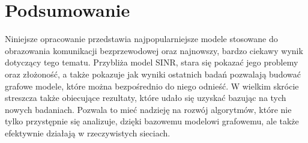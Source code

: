 \documentclass[11pt,a4paper,onecolumn,twoside]{mwart}
\begin{document}
\section{Podsumowanie}
Niniejsze opracowanie przedstawia najpopularniejsze modele stosowane do
obrazowania komunikacji bezprzewodowej oraz najnowszy, bardzo ciekawy wynik
dotyczący tego tematu. Przybliża model SINR, stara się pokazać jego problemy
oraz złożoność, a także pokazuje jak wyniki ostatnich badań pozwalają budować
grafowe modele, które można bezpośrednio do niego odnieść. W wielkim skrócie
streszcza także obiecujące rezultaty, które udało się uzyskać bazując na tych
nowych badaniach. Pozwala to mieć nadzieję na rozwój algorytmów, które nie tylko
przystępnie się analizuje, dzięki bazowemu modelowi grafowemu, ale także
efektywnie działają w rzeczywistych sieciach.

{}

\end{document}

